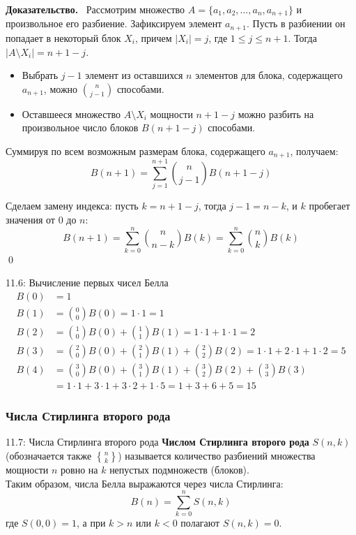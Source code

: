 \documentclass[a4paper,12pt]{article}
\newcommand{\myproof}{\textbf{Доказательство.}\ }
\begin{document}
	\myproof
	Рассмотрим множество \(A = \{a_1, a_2, \dots, a_n, a_{n+1}\}\) и произвольное его разбиение. Зафиксируем элемент \(a_{n+1}\). Пусть в разбиении он попадает в некоторый блок \(X_i\), причем \(|X_i| = j\), где \(1 \le j \le n+1\). Тогда \(|A \setminus X_i| = n+1-j\).
	
	\begin{itemize}
		\item Выбрать \(j-1\) элемент из оставшихся \(n\) элементов для блока, содержащего \(a_{n+1}\), можно \(\binom{n}{j-1}\) способами.
		\item Оставшееся множество \(A \setminus X_i\) мощности \(n+1-j\) можно разбить на произвольное число блоков \(B(n+1-j)\) способами.
	\end{itemize}
	
	Суммируя по всем возможным размерам блока, содержащего \(a_{n+1}\), получаем:
	\[ B(n+1) = \sum_{j=1}^{n+1} \binom{n}{j-1} B(n+1-j) \]
	
	Сделаем замену индекса: пусть \(k = n+1-j\), тогда \(j-1 = n-k\), и \(k\) пробегает значения от \(0\) до \(n\):
	\[ B(n+1) = \sum_{k=0}^{n} \binom{n}{n-k} B(k) = \sum_{k=0}^{n} \binom{n}{k} B(k) \]
	\qed
	
	\begin{examplebox}{11.6: Вычисление первых чисел Белла}
		\begin{align*}
			B(0) &= 1 \\
			B(1) &= \binom{0}{0} B(0) = 1 \cdot 1 = 1 \\
			B(2) &= \binom{1}{0} B(0) + \binom{1}{1} B(1) = 1 \cdot 1 + 1 \cdot 1 = 2 \\
			B(3) &= \binom{2}{0} B(0) + \binom{2}{1} B(1) + \binom{2}{2} B(2) = 1 \cdot 1 + 2 \cdot 1 + 1 \cdot 2 = 5 \\
			B(4) &= \binom{3}{0} B(0) + \binom{3}{1} B(1) + \binom{3}{2} B(2) + \binom{3}{3} B(3) \\
			&= 1 \cdot 1 + 3 \cdot 1 + 3 \cdot 2 + 1 \cdot 5 = 1 + 3 + 6 + 5 = 15
		\end{align*}
	\end{examplebox}
	
	\subsubsection{Числа Стирлинга второго рода}
	
	\begin{definitionbox}{11.7: Числа Стирлинга второго рода}
		\textbf{Числом Стирлинга второго рода} \(S(n, k)\) (обозначается также \(\genfrac{\{}{\}}{0pt}{}{n}{k}\)) называется количество разбиений множества мощности \(n\) ровно на \(k\) непустых подмножеств (блоков).\\
		
		Таким образом, числа Белла выражаются через числа Стирлинга:
		\[ B(n) = \sum_{k=0}^{n} S(n, k) \]
		где \(S(0,0) = 1\), а при \(k > n\) или \(k < 0\) полагают \(S(n, k) = 0\).
	\end{definitionbox}
	
\end{document}
